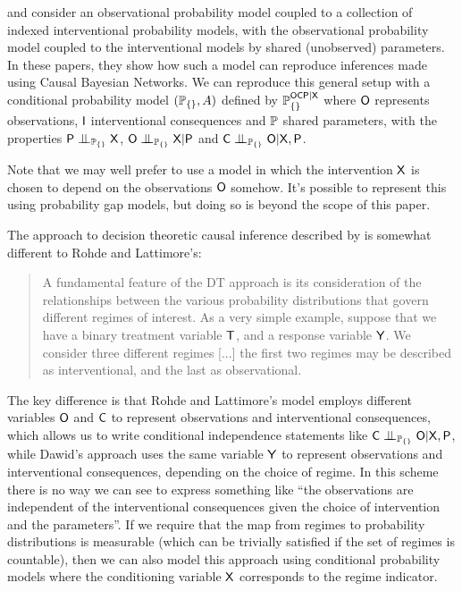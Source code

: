 \citet{lattimore_causal_2019} and \citet{lattimore_replacing_2019} consider an observational probability model coupled to a collection of indexed interventional probability models, with the observational probability model coupled to the interventional models by shared (unobserved) parameters. In these papers, they show how such a model can reproduce inferences made using Causal Bayesian Networks. We can reproduce this general setup with a conditional probability model $(\mathbb{P}_{\{\}},A)$ defined by $\mathbb{P}_{\{\}}^{\mathsf{OCP}|\mathsf{X}}$ where $\mathsf{O}$ represents observations, $\mathsf{I}$ interventional consequences and $\mathbb{P}$ shared parameters, with the properties $\RV{P}\CI_{\prob{P}_{\{\}}} \RV{X}$, $\RV{O}\CI_{\prob{P}_{\{\}}} \RV{X}|\RV{P}$ and $\RV{C}\CI_{\prob{P}_{\{\}}} \RV{O}|\RV{X},\RV{P}$.

Note that we may well prefer to use a model in which the intervention $\mathsf{X}$ is chosen to depend on the observations $\mathsf{O}$ somehow. It's possible to represent this using probability gap models, but doing so is beyond the scope of this paper.

The approach to decision theoretic causal inference described by \citet{dawid_decision-theoretic_2020} is somewhat different to Rohde and Lattimore's:

\begin{quote}
A fundamental feature of the DT approach is its consideration of the relationships between the various probability distributions that govern different regimes of interest. As a very simple example, suppose that we have a binary treatment variable $\mathsf{T}$, and a response variable $\mathsf{Y}$. We consider three different regimes [...] the first two regimes may be described as interventional, and the last as observational.
\end{quote}

The key difference is that Rohde and Lattimore's model employs different variables $\mathsf{O}$ and $\mathsf{C}$ to represent observations and interventional consequences, which allows us to write conditional independence statements like $\RV{C}\CI_{\prob{P}_{\{\}}} \RV{O}|\RV{X},\RV{P}$, while Dawid's approach uses the same variable $\mathsf{Y}$ to represent observations and interventional consequences, depending on the choice of regime. In this scheme there is no way we can see to express something like ``the observations are independent of the interventional consequences given the choice of intervention and the parameters''. If we require that the map from regimes to probability distributions is measurable (which can be trivially satisfied if the set of regimes is countable), then we can also model this approach using conditional probability models where the conditioning variable $\mathsf{X}$ corresponds to the regime indicator.


